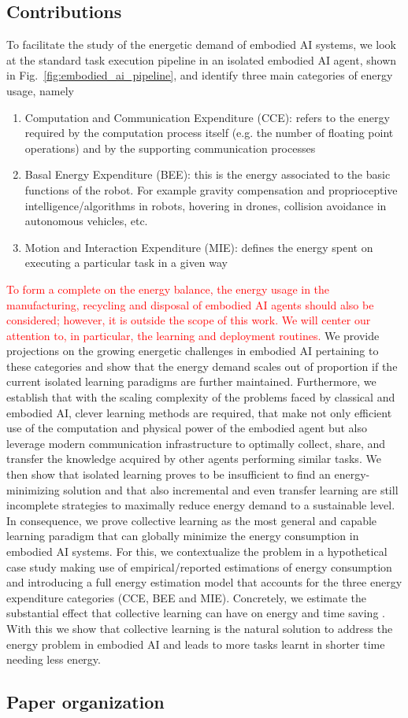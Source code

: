 \subsection{Contributions}
To facilitate the study of the energetic demand of embodied AI systems, we look at the standard task execution pipeline in an isolated embodied AI agent, shown in Fig.~\ref{fig:embodied_ai_pipeline}, and identify three main categories of energy usage, namely 
\begin{enumerate}
    \item Computation and Communication Expenditure (CCE): refers to the energy required by the computation process itself (e.g. the number of floating point operations) and by the supporting communication processes
    \item Basal Energy Expenditure (BEE): this is the energy associated to the basic functions of the robot. For example gravity compensation and proprioceptive intelligence/algorithms in robots, hovering in drones, collision avoidance in autonomous vehicles, etc.
    \item Motion and Interaction Expenditure (MIE): defines the energy spent on executing a particular task in a given way
\end{enumerate}
 \textcolor{red}{To form a complete on the energy balance, the energy usage in the manufacturing, recycling and disposal of embodied AI agents should also be considered; however, it is outside the scope of this work. We will center our attention to, in particular, the learning and deployment routines.} We provide projections on the growing energetic challenges in embodied AI pertaining to these categories and show that the energy demand scales out of proportion if the current isolated learning paradigms are further maintained. Furthermore, we establish that with the scaling complexity of the problems faced by classical and embodied AI, clever learning methods are required, that make not only efficient use of the computation and physical power of the embodied agent but also leverage modern communication infrastructure to optimally collect, share, and transfer the knowledge acquired by other agents performing similar tasks. We then show that isolated learning proves to be insufficient to find an energy-minimizing solution and that also incremental and even transfer learning are still incomplete strategies to maximally reduce energy demand to a sustainable level. In consequence, we prove collective learning as the most general and capable learning paradigm that can globally minimize the energy consumption in embodied AI systems. For this, we contextualize the problem in a hypothetical case study  making use of empirical/reported estimations of energy consumption and introducing a full energy estimation model that accounts for the three energy expenditure categories (CCE, BEE and MIE). Concretely, we estimate the substantial effect that collective learning can have on energy and time saving {\color{red}{in a smart factory scenario with a large number of robots performing a large number of tasks probably existing in the near future}}. With this we show that collective learning is the natural solution to address the energy problem in embodied AI and leads to more tasks learnt in shorter time needing less energy.

\subsection{Paper organization}
\TODO